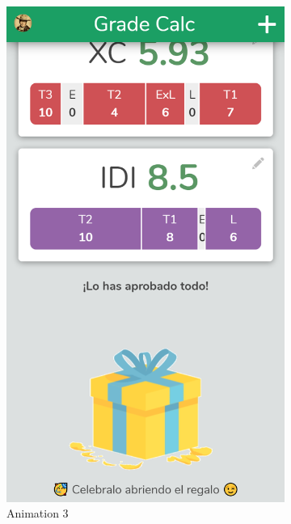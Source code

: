 \begin{figure}[htbp!]
\begin{subfigure}[b]{0.23\textwidth-0.1cm}
        \includegraphics[width=\textwidth]{media/screenshots/screenshot-gift-3.png}
        \caption{Animation 3}
    \end{subfigure}
    \begin{subfigure}[b]{0.23\textwidth-0.1cm}
        \centering

\end{subfigure}
\end{figure}
